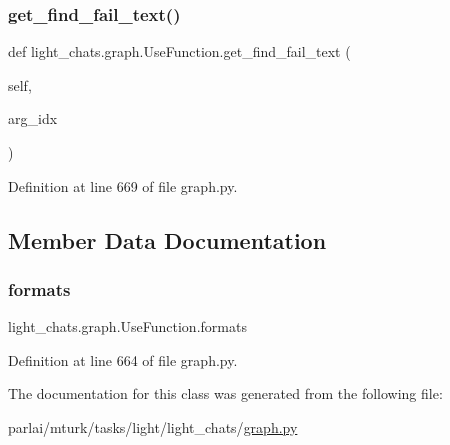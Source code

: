 \subsubsection{\texorpdfstring{get\+\_\+find\+\_\+fail\+\_\+text()}{get\_find\_fail\_text()}}
{\footnotesize\ttfamily def light\+\_\+chats.\+graph.\+Use\+Function.\+get\+\_\+find\+\_\+fail\+\_\+text (\begin{DoxyParamCaption}\item[{}]{self,  }\item[{}]{arg\+\_\+idx }\end{DoxyParamCaption})}



Definition at line 669 of file graph.\+py.



\subsection{Member Data Documentation}
\mbox{\label{classlight__chats_1_1graph_1_1UseFunction_ab5894266d221cc0d34b1e653b4bafc2d}} 
\subsubsection{\texorpdfstring{formats}{formats}}
{\footnotesize\ttfamily light\+\_\+chats.\+graph.\+Use\+Function.\+formats}



Definition at line 664 of file graph.\+py.



The documentation for this class was generated from the following file\+:\begin{DoxyCompactItemize}
\item 
parlai/mturk/tasks/light/light\+\_\+chats/\hyperlink{parlai_2mturk_2tasks_2light_2light__chats_2graph_8py}{graph.\+py}\end{DoxyCompactItemize}
